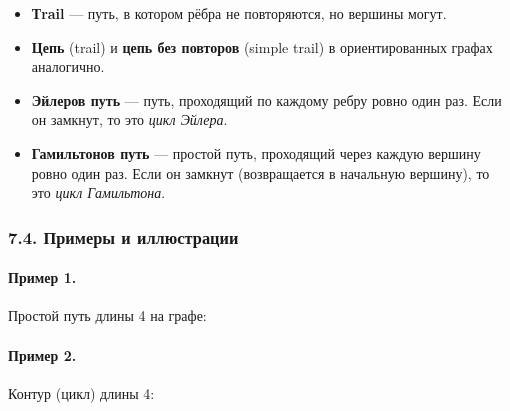 \begin{itemize}[leftmargin=*]
  \item \textbf{Тrail} — путь, в котором рёбра не повторяются, но вершины могут.
  \item \textbf{Цепь} (trail) и \textbf{цепь без повторов} (simple trail) в ориентированных графах аналогично.
  \item \textbf{Эйлеров путь} — путь, проходящий по каждому ребру ровно один раз. Если он замкнут, то это \emph{цикл Эйлера}.
  \item \textbf{Гамильтонов путь} — простой путь, проходящий через каждую вершину ровно один раз. Если он замкнут (возвращается в начальную вершину), то это \emph{цикл Гамильтона}.
\end{itemize}

\subsubsection{7.4. Примеры и иллюстрации}

\paragraph{Пример 1.} Простой путь длины 4 на графе:

\begin{center}
\end{center}

\paragraph{Пример 2.} Контур (цикл) длины 4:

\begin{center}
\end{center}

